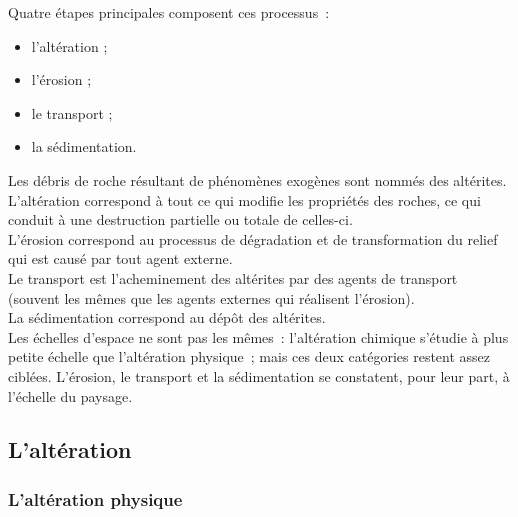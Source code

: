 \documentclass[a4paper,11pt]{article}
\begin{document}
Quatre étapes principales composent ces processus~:
\begin{itemize}
  \item l'altération ;
  \item l'érosion ;
  \item le transport ;
  \item la sédimentation.
\end{itemize}

\medbreak

Les débris de roche résultant de phénomènes exogènes sont nommés des altérites. \\
L'altération correspond à tout ce qui modifie les propriétés des roches, ce qui conduit à une destruction partielle ou totale de celles-ci. \\
L'érosion correspond au processus de dégradation et de transformation du relief qui est causé par tout agent externe. \\
Le transport est l'acheminement des altérites par des agents de transport (souvent les mêmes que les agents externes qui réalisent l'érosion). \\
La sédimentation correspond au dépôt des altérites. \\

Les échelles d'espace ne sont pas les mêmes~: l'altération chimique s'étudie à plus petite échelle que l'altération physique~; mais ces deux catégories restent assez ciblées.
L'érosion, le transport et la sédimentation se constatent, pour leur part, à l'échelle du paysage. \\

\subsection{L'altération}
\subsubsection{L'altération physique}
\end{document}
